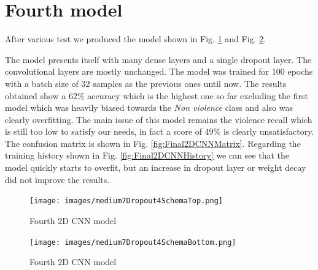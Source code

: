 \section{Fourth model}
After various test we produced the model shown in Fig. \ref{fig:Final2DCNN} and Fig. \ref{fig:Final2DCNN2}.

The model presents itself with many dense layers and a single dropout layer. The convolutional layers are mostly unchanged. The model was trained for 100 epochs with a batch size of 32 samples as the previous ones until now. The results obtained show a 62\% accuracy which is the highest one so far excluding the first model which was heavily biased towards the \textit{Non violence} class and also was clearly overfitting. The main issue of this model remains the violence recall which is still too low to satisfy our needs, in fact a score of 49\% is clearly unsatisfactory. The confusion matrix is shown in Fig. \ref{fig:Final2DCNNMatrix}. Regarding the training history shown in Fig. \ref{fig:Final2DCNNHistory} we can see that the model quickly starts to overfit, but an increase in dropout layer or weight decay did not improve the results.

\iftrue
\begin{figure}[]
    \centering
    \texttt{[image: images/medium7Dropout4SchemaTop.png]}
    \caption{Fourth 2D CNN model}
    \label{fig:Final2DCNN}
\end{figure}

\begin{figure}[]
    \centering
    \texttt{[image: images/medium7Dropout4SchemaBottom.png]}
    \caption{Fourth 2D CNN model}
    \label{fig:Final2DCNN2}
\end{figure}
\fi

